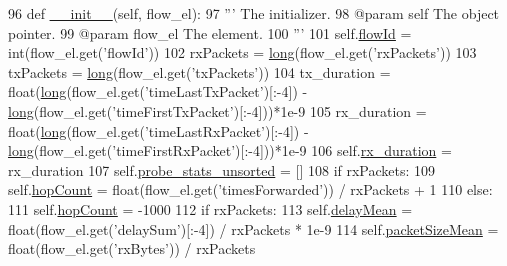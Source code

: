 \begin{DoxyCode}
96     \textcolor{keyword}{def }\hyperlink{classflowmon-parse-results_1_1Flow_a89e1cb163dc1b1d04b844829eede004f}{\_\_init\_\_}(self, flow\_el):
97         \textcolor{stringliteral}{''' The initializer.}
98 \textcolor{stringliteral}{        @param self The object pointer.}
99 \textcolor{stringliteral}{        @param flow\_el The element.}
100 \textcolor{stringliteral}{        '''}
101         self.\hyperlink{classflowmon-parse-results_1_1Flow_acaeb7a34b0ed25c4bfdfc7e497015e9f}{flowId} = int(flow\_el.get(\textcolor{stringliteral}{'flowId'}))
102         rxPackets = \hyperlink{generate__test__data__lte__sinr_8m_a0eab6be67e93c3411f7a8b53cc297285}{long}(flow\_el.get(\textcolor{stringliteral}{'rxPackets'}))
103         txPackets = \hyperlink{generate__test__data__lte__sinr_8m_a0eab6be67e93c3411f7a8b53cc297285}{long}(flow\_el.get(\textcolor{stringliteral}{'txPackets'}))
104         tx\_duration = float(\hyperlink{generate__test__data__lte__sinr_8m_a0eab6be67e93c3411f7a8b53cc297285}{long}(flow\_el.get(\textcolor{stringliteral}{'timeLastTxPacket'})[:-4]) - 
      \hyperlink{generate__test__data__lte__sinr_8m_a0eab6be67e93c3411f7a8b53cc297285}{long}(flow\_el.get(\textcolor{stringliteral}{'timeFirstTxPacket'})[:-4]))*1e-9
105         rx\_duration = float(\hyperlink{generate__test__data__lte__sinr_8m_a0eab6be67e93c3411f7a8b53cc297285}{long}(flow\_el.get(\textcolor{stringliteral}{'timeLastRxPacket'})[:-4]) - 
      \hyperlink{generate__test__data__lte__sinr_8m_a0eab6be67e93c3411f7a8b53cc297285}{long}(flow\_el.get(\textcolor{stringliteral}{'timeFirstRxPacket'})[:-4]))*1e-9
106         self.\hyperlink{classflowmon-parse-results_1_1Flow_ab082f1677744e57e7e2cf7b23b589dc8}{rx\_duration} = rx\_duration
107         self.\hyperlink{classflowmon-parse-results_1_1Flow_ada58349bc1acdf422a8421e527030dc5}{probe\_stats\_unsorted} = []
108         \textcolor{keywordflow}{if} rxPackets:
109             self.\hyperlink{classflowmon-parse-results_1_1Flow_accb8647fe9e2e8da4c7ff76fd77a5709}{hopCount} = float(flow\_el.get(\textcolor{stringliteral}{'timesForwarded'})) / rxPackets + 1
110         \textcolor{keywordflow}{else}:
111             self.\hyperlink{classflowmon-parse-results_1_1Flow_accb8647fe9e2e8da4c7ff76fd77a5709}{hopCount} = -1000
112         \textcolor{keywordflow}{if} rxPackets:
113             self.\hyperlink{classflowmon-parse-results_1_1Flow_ac8365a583c4b8896bc96fac3d35f7cbe}{delayMean} = float(flow\_el.get(\textcolor{stringliteral}{'delaySum'})[:-4]) / rxPackets * 1e-9
114             self.\hyperlink{classflowmon-parse-results_1_1Flow_a4989e2cc50c300a39cde6bb977e00e5f}{packetSizeMean} = float(flow\_el.get(\textcolor{stringliteral}{'rxBytes'})) / rxPackets

\end{DoxyCode}
